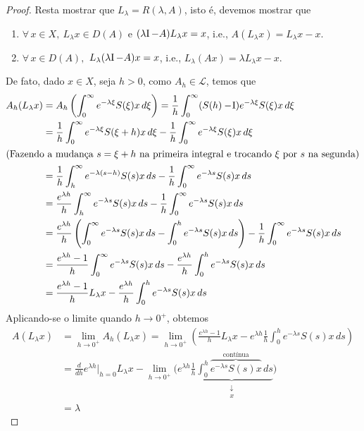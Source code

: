\begin{proof}
Resta mostrar que  $L_\lambda= R(\lambda,A)$, isto é, devemos mostrar que
\begin{enumerate}
\item $\forall\, x\in X,\ L_\lambda x\in D(A)$ e $(\lambda \operatorname{\!I}-A)L_\lambda x=x$, i.e., $A\left(L_\lambda x\right)=L_\lambda x -x$.
\item $\forall\, x\in D(A),$ $L_\lambda(\lambda \operatorname{\!I}-A)x=x$, i.e., $L_\lambda(Ax)=\lambda L_\lambda x-x$.
\end{enumerate}

De fato, dado $x\in X$, seja $h>0$, como $A_h\in \mathcal{L}$, temos que
\begin{align*}
A_h(L_\lambda x)& =A_h\left(\int_0^\infty e^{-\lambda \xi}S(\xi)x\, d\xi\right)
=\frac{1}{h}\int_0^\infty (S(h)-\operatorname{\!I}) e^{-\lambda \xi}S(\xi)x\, d\xi\\
&= \frac{1}{h}\int_0^\infty e^{-\lambda \xi}S(\xi+h)x\, d\xi- 
\frac{1}{h}\int_0^\infty e^{-\lambda \xi}S(\xi)x\, d\xi\\
\shortintertext{(Fazendo a mudança $s=\xi+h$ na primeira integral e trocando $\xi$ por $s$ na segunda)}
& = \frac{1}{h}\int_h^\infty e^{-\lambda (s-h)}S(s)x\, ds- 
\frac{1}{h}\int_0^\infty e^{-\lambda s}S(s)x\, ds\\
& = \frac{e^{\lambda h}}{h}\int_h^\infty e^{-\lambda s}S(s)x\, ds- 
\frac{1}{h}\int_0^\infty e^{-\lambda s}S(s)x\, ds\\
& = \frac{e^{\lambda h}}{h}\left(\int_0^\infty e^{-\lambda s}S(s)x\, ds
-\int_0^h e^{-\lambda s}S(s)x\, ds\right)- 
\frac{1}{h}\int_0^\infty e^{-\lambda s}S(s)x\, ds\\
& = \frac{e^{\lambda h}-1}{h}\int_0^\infty e^{-\lambda s}S(s)x\, ds
-\frac{e^{\lambda h}}{h}\int_0^h e^{-\lambda s}S(s)x\, ds\\
&= \frac{e^{\lambda h}-1}{h}L_\lambda x
-\frac{e^{\lambda h}}{h}\int_0^h e^{-\lambda s}S(s)x\, ds
\end{align*}
Aplicando-se o limite quando $h\to0^+$, obtemos
\begin{align*}
A\left(L_\lambda x\right)&=\lim_{h\to0^+}A_h(L_\lambda x) =\lim_{h\to0^+}\left(\frac{e^{\lambda h}-1}{h}
L_\lambda x-e^{\lambda h}\frac{1}{h}\int_0^h
e^{-\lambda s}S(s)x\, ds\right)\\
& =\frac{d}{dh}e^{\lambda h}\Big\vert_{h=0}
L_\lambda x-\lim_{h\to0^+}
\bigg(e^{\lambda h}\underbrace{\frac{1}{h}\int_0^h
\overbrace{e^{-\lambda s}S(s)x}^{\text{contínua}}\,
 ds}_{\substack{\downarrow \\ x}}\bigg)\\[-1em]
& =\lambda

\end{align*}
\end{proof}
